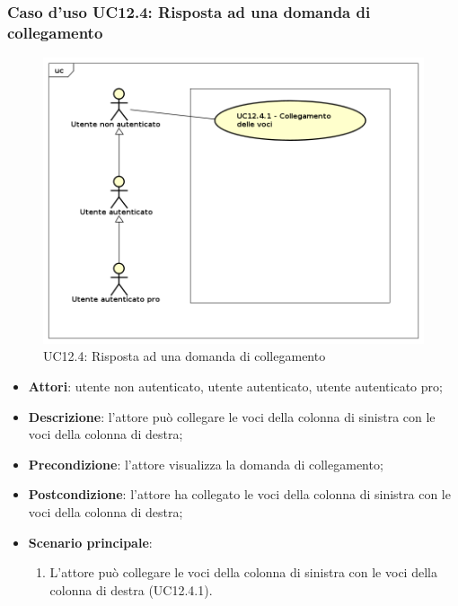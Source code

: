 \subsubsection{Caso d'uso UC12.4: Risposta ad una domanda di collegamento}
\begin{figure}[h]
	\centering
	\includegraphics[scale=0.5]{UML/UC12_4.png}
	\caption{UC12.4: Risposta ad una domanda di collegamento}
\end{figure}
\begin{itemize}
\item \textbf{Attori}: utente non autenticato, utente autenticato, utente autenticato pro;
\item \textbf{Descrizione}: l'attore può collegare le voci della colonna di sinistra con le voci della colonna di destra;
\item \textbf{Precondizione}: l'attore visualizza la domanda di collegamento;
\item \textbf{Postcondizione}: l'attore ha collegato le voci della colonna di sinistra con le voci della colonna di destra;
\item \textbf{Scenario principale}: 
\begin{enumerate}
\item L'attore può collegare le voci della colonna di sinistra con le voci della colonna di destra (UC12.4.1).
\end{enumerate}
\end{itemize}

\newpage
